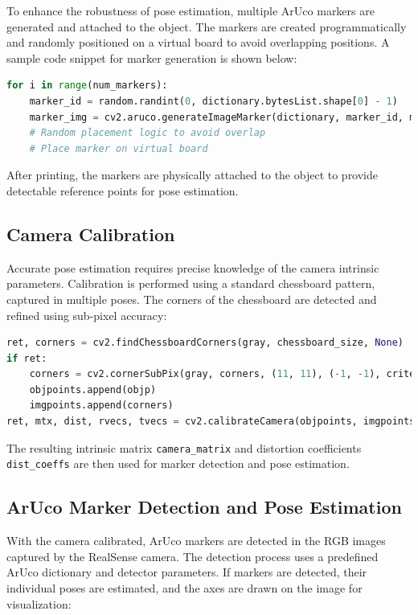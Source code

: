 To enhance the robustness of pose estimation, multiple ArUco markers are generated and attached to the object. 
The markers are created programmatically and randomly positioned on a virtual board to avoid overlapping positions. 
A sample code snippet for marker generation is shown below:

\begin{lstlisting}[basicstyle=\ttfamily\scriptsize, language=Python]
for i in range(num_markers):
    marker_id = random.randint(0, dictionary.bytesList.shape[0] - 1)
    marker_img = cv2.aruco.generateImageMarker(dictionary, marker_id, marker_size)
    # Random placement logic to avoid overlap
    # Place marker on virtual board
\end{lstlisting}

\noindent After printing, the markers are physically attached to the object to provide detectable reference points for pose estimation.

\subsection{Camera Calibration}

Accurate pose estimation requires precise knowledge of the camera intrinsic parameters. 
Calibration is performed using a standard chessboard pattern, captured in multiple poses. The corners of the chessboard are detected and refined using sub-pixel accuracy:

\begin{lstlisting}[basicstyle=\ttfamily\scriptsize, language=Python]
ret, corners = cv2.findChessboardCorners(gray, chessboard_size, None)
if ret:
    corners = cv2.cornerSubPix(gray, corners, (11, 11), (-1, -1), criteria)
    objpoints.append(objp)
    imgpoints.append(corners)
ret, mtx, dist, rvecs, tvecs = cv2.calibrateCamera(objpoints, imgpoints, gray.shape[::-1], None, None)
\end{lstlisting}

\noindent The resulting intrinsic matrix \texttt{camera\_matrix} and distortion coefficients \texttt{dist\_coeffs} are then used for marker detection and pose estimation.

\subsection{ArUco Marker Detection and Pose Estimation}

With the camera calibrated, ArUco markers are detected in the RGB images captured by the RealSense camera. 
The detection process uses a predefined ArUco dictionary and detector parameters. 
If markers are detected, their individual poses are estimated, and the axes are drawn on the image for visualization:

